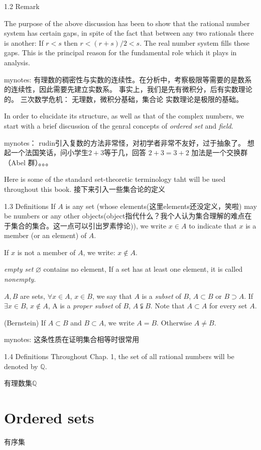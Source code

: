 1.2 Remark

The purpose of the above discussion has been to show that the rational number system has certain gaps, 
in spite of the fact that between any two rationals there is another: If $r<s$ then $r<(r+s)/2<s$.
The real number system fills these gaps.
This is the principal reason for the fundamental role which it plays in analysis.

mynotes:
有理数的稠密性与实数的连续性。在分析中，考察极限等需要的是数系的连续性，因此需要先建立实数系。
事实上，我们是先有微积分，后有实数理论的。
三次数学危机：
无理数，微积分基础，集合论
实数理论是极限的基础。

In order to elucidate its structure, as well as that of the complex numbers, 
we start with a brief discussion of the genral concepts of \emph{ordered set} and \emph{field}.

mynotes：
rudin引入复数的方法非常怪，对初学者非常不友好，过于抽象了。
想起一个法国笑话，问小学生$2+3$等于几，回答 $2+3=3+2$ 加法是一个交换群（Abel 群）。。。

Here is some of the standard set-theoretic terminology taht will be used throughout this book.
接下来引入一些集合论的定义

1.3 Definitions
If $A$ is any set (whose elements(这里elements还没定义，笑啦) may be numbers or any other objects(object指代什么？我个人认为集合理解的难点在于集合的集合。这一点可以引出罗素悖论)), we write $x\in A$ to indicate that $x$ is a member (or an element) of $A$.

If $x$ is not a member of $A$, we write: $x\notin A$.

\emph{empty set} $\varnothing$ contains no element, If a set has at least one element, it is called \emph{nonempty}.

$A,B$ are sets, $\forall x\in A$, $x\in B$, we say that $A$ is a \emph{subset} of $B$, $A\subset B$ or $B\supset A$. If $\exists x\in B$, $x\notin A$, A is a \emph{proper subset} of $B$, $A \subsetneqq B$.
Note that $A\subset A$ for every set $A$.

(Bernstein) If $A\subset B$ and $B\subset A$, we write $A = B$. Otherwise $A\neq B$.

mynotes:
这条性质在证明集合相等时很常用

1.4 Definitions
Throughout Chap. 1, the set of all rational numbers will be denoted by $\mathbb{Q}$.

有理数集$\mathbb{Q}$

\section{Ordered sets}
有序集

